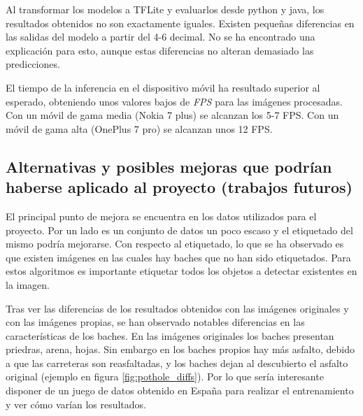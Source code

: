Al transformar los modelos a TFLite y evaluarlos desde python y java, los resultados obtenidos no son exactamente iguales. Existen pequeñas diferencias en las salidas del modelo a partir del 4-6 decimal. No se ha encontrado una explicación para esto, aunque estas diferencias no alteran demasiado las predicciones.

El tiempo de la inferencia en el dispositivo móvil ha resultado superior al esperado, obteniendo unos valores bajos de \textit{FPS} para las imágenes procesadas. Con un móvil de gama media (Nokia 7 plus) se alcanzan los 5-7 FPS. Con un móvil de gama alta (OnePlus 7 pro) se alcanzan unos 12 FPS.

\subsection{Alternativas y posibles mejoras que podrían haberse aplicado al proyecto (trabajos futuros)}

El principal punto de mejora se encuentra en los datos utilizados para el proyecto. Por un lado es un conjunto de datos un poco escaso y el etiquetado del mismo podría mejorarse. Con respecto al etiquetado, lo que se ha observado es que existen imágenes en las cuales hay baches que no han sido etiquetados. Para estos algoritmos es importante etiquetar todos los objetos a detectar existentes en la imagen.

Tras ver las diferencias de los resultados obtenidos con las imágenes originales y con las imágenes propias, se han observado notables diferencias en las características de los baches. En las imágenes originales los baches presentan priedras, arena, hojas. Sin embargo en los baches propios hay más asfalto, debido a que las carreteras son reasfaltadas, y los baches dejan al descubierto el asfalto original (ejemplo en figura \ref{fig:pothole_diffs}). Por lo que sería interesante disponer de un juego de datos obtenido en España para realizar el entrenamiento y ver cómo varían los resultados.

